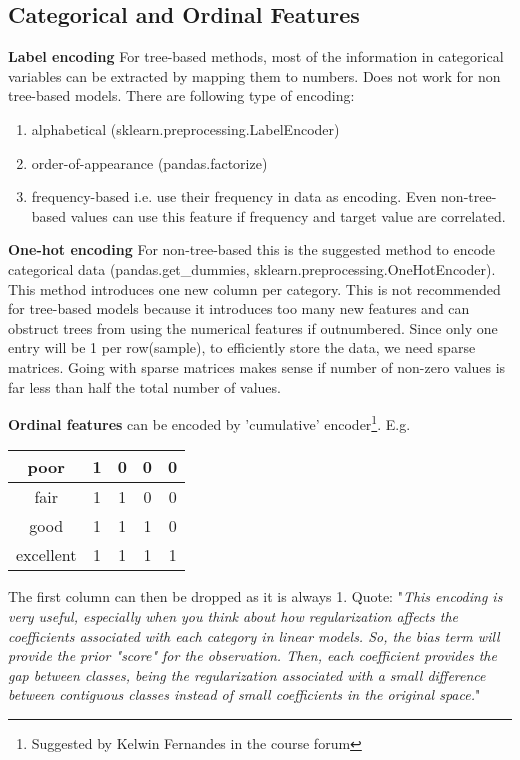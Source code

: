 \documentclass[a4paper]{article}
\begin{document}
\subsection{Categorical and Ordinal Features}
\textbf{Label encoding} For tree-based methods, most of the information in categorical variables can be extracted by mapping them to numbers. Does not work for non tree-based models. There are following type of encoding:
\begin{enumerate}
\item alphabetical (sklearn.preprocessing.LabelEncoder)
\item order-of-appearance (pandas.factorize)
\item frequency-based i.e. use their frequency in data as encoding. Even non-tree-based values can use this feature if frequency and target value are correlated.
\end{enumerate}

\textbf{One-hot encoding} For non-tree-based this is the suggested method to encode categorical data (pandas.get\_dummies, sklearn.preprocessing.OneHotEncoder). This method introduces one new column per category. This is not recommended for tree-based models because it introduces too many new features and can obstruct trees from using the numerical features if outnumbered. Since only one entry will be 1 per row(sample), to efficiently store the data, we need sparse matrices. Going with sparse matrices makes sense if number of non-zero values is far less than half the total number of values.

\textbf{Ordinal features} can be encoded by 'cumulative' encoder\footnote{Suggested by Kelwin Fernandes in the course forum}. E.g.
\begin{tabular}{|c|c|c|c|c|}
\hline 
poor & 1 & 0 & 0 & 0 \\ 
\hline 
fair & 1 & 1 & 0 & 0 \\ 
\hline 
good & 1 & 1 & 1 & 0 \\ 
\hline 
excellent & 1 & 1 & 1 & 1 \\ 
\hline 
\end{tabular}

The first column can then be dropped as it is always 1. Quote: "\textit{This encoding is very useful, especially when you think about how regularization affects the coefficients associated with each category in linear models. So, the bias term will provide the prior "score" for the observation. Then, each coefficient provides the gap between classes, being the regularization associated with a small difference between contiguous classes instead of small coefficients in the original space.}"
\end{document}
